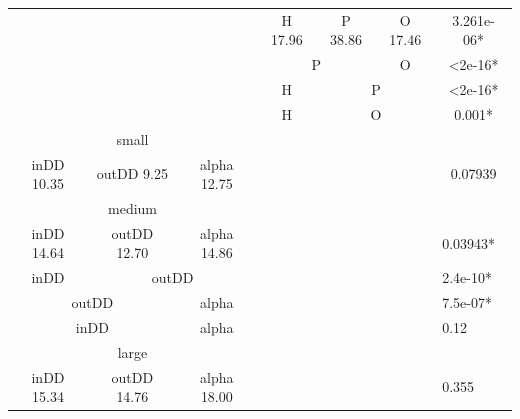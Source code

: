 \documentclass{l4proj}
\begin{document}
\begin{table}[]
\begin{tabular}{|c|c|c|c|c|c|c|}
\multicolumn{3}{|c|}{}                    & H 17.96     & P 38.86     & O 17.46     & 3.261e-06*                    \\ \cline{4-7} 
\multicolumn{3}{|c|}{}                    & \multicolumn{2}{c|}{P}    & O           & \textless2e-16*               \\ \cline{4-7} 
\multicolumn{3}{|c|}{}                    & H           & \multicolumn{2}{c|}{P}    & \textless2e-16*               \\ \cline{4-7} 
\multicolumn{3}{|c|}{}                    & H           & \multicolumn{2}{c|}{O}    & 0.001*                        \\ \hline
\multicolumn{3}{|c|}{small}               & \multicolumn{3}{c|}{\multirow{9}{*}{}}  &                               \\ \cline{1-3} \cline{7-7} 
inDD 10.35   & outDD 9.25   & alpha 12.75 & \multicolumn{3}{c|}{}                   & 0.07939                       \\ \cline{1-3} \cline{7-7} 
\multicolumn{3}{|c|}{medium}              & \multicolumn{3}{c|}{}                   &                               \\ \cline{1-3} \cline{7-7} 
inDD 14.64   & outDD 12.70  & alpha 14.86 & \multicolumn{3}{c|}{}                   & \multicolumn{1}{l|}{0.03943*} \\ \cline{1-3} \cline{7-7} 
inDD         & \multicolumn{2}{c|}{outDD} & \multicolumn{3}{c|}{}                   & \multicolumn{1}{l|}{2.4e-10*} \\ \cline{1-3} \cline{7-7} 
\multicolumn{2}{|c|}{outDD} & alpha       & \multicolumn{3}{c|}{}                   & \multicolumn{1}{l|}{7.5e-07*} \\ \cline{1-3} \cline{7-7} 
\multicolumn{2}{|c|}{inDD}  & alpha       & \multicolumn{3}{c|}{}                   & \multicolumn{1}{l|}{0.12}     \\ \cline{1-3} \cline{7-7} 
\multicolumn{3}{|c|}{large}               & \multicolumn{3}{c|}{}                   & \multicolumn{1}{l|}{}         \\ \cline{1-3} \cline{7-7} 
inDD 15.34   & outDD 14.76  & alpha 18.00 & \multicolumn{3}{c|}{}                   & \multicolumn{1}{l|}{0.355}    \\ \hline
\end{tabular}
\end{table}
\end{document}
